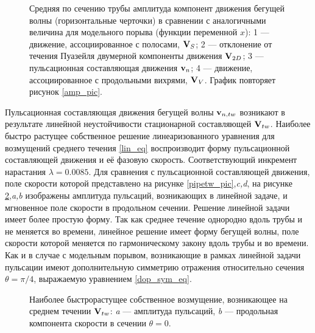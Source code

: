 \begin{figure}
\caption{Средняя по сечению трубы амплитуда компонент движения бегущей волны (горизонтальные черточки) в сравнении с аналогичными величина для модельного порыва (функции переменной $x$): 1 --- движение, ассоциированное с полосами, $\mathbf{V}_S$; 2 --- отклонение от течения Пуазейля двумерной компоненты движения $\mathbf{V}_{2D}$; 3 --- пульсационная составляющая движения $\mathbf{v}_n$; 4 --- движение, ассоциированное с продольными вихрями, $\mathbf{V}_V$. График повторяет рисунок \ref{amp_pic}.}
\label{pipetw_amp_pic}
\end{figure}

Пульсационная составляющая движения бегущей волны $\mathbf{v}_{n,tw}$ возникают в результате линейной неустойчивости стационарной составляющей $\mathbf{V}_{tw}$. Наиболее быстро растущее собственное решение линеаризованного уравнения для возмущений среднего течения \eqref{lin_eq} воспроизводит форму пульсационной составляющей движения и её фазовую скорость. Соответствующий инкремент нарастания $\lambda = 0.0085$. Для сравнения с пульсационной составляющей движения, поле скорости которой представлено на рисунке \ref{pipetw_pic},{\it c,d}, на рисунке \ref{pipetw_lin_pic},{\it a,b} изображены амплитуда пульсаций, возникающих в линейной задаче, и мгновенное поле скорости в продольном сечении. Решение линейной задачи имеет более простую форму. Так как среднее течение однородно вдоль трубы и не меняется во времени, линейное решение имеет форму бегущей волны, поле скорости которой меняется по гармоническому закону вдоль трубы и во времени. Как и в случае с модельным порывом, возникающие в рамках линейной задачи пульсации имеют дополнительную симметрию отражения относительно сечения $\theta = \pi/4$, выражаемую уравнением \eqref{dop_sym_eq}. 


\begin{figure}
\caption{Наиболее быстрорастущее собственное возмущение, возникающее на среднем течении $\mathbf{V}_{tw}$: {\it a} --- амплитуда пульсаций, {\it b} --- продольная компонента скорости в сечении $\theta = 0$. }
\label{pipetw_lin_pic}
\end{figure}



